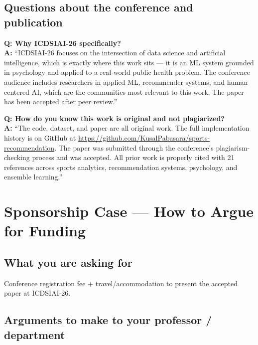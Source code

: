 \documentclass[12pt,a4paper]{article}
\begin{document}
\subsection{Questions about the conference and publication}

\begin{qabox}
\textbf{Q: Why ICDSIAI-26 specifically?}\\[4pt]
\textbf{A:} ``ICDSIAI-26 focuses on the intersection of data science and
artificial intelligence, which is exactly where this work sits --- it is an
ML system grounded in psychology and applied to a real-world public health
problem. The conference audience includes researchers in applied ML,
recommender systems, and human-centered AI, which are the communities most
relevant to this work. The paper has been accepted after peer review.''
\end{qabox}

\begin{qabox}
\begin{sloppypar}
\textbf{Q: How do you know this work is original and not plagiarized?}\\[4pt]
\textbf{A:} ``The code, dataset, and paper are all original work. The full
implementation history is on GitHub at
\url{https://github.com/KusalPabasara/sports-recommendation}.
The paper was submitted through the conference's plagiarism-checking process
and was accepted. All prior work is properly cited with 21 references across
sports analytics, recommendation systems, psychology, and ensemble learning.''
\end{sloppypar}
\end{qabox}

\section{Sponsorship Case --- How to Argue for Funding}

\subsection{What you are asking for}

Conference registration fee + travel/accommodation to present the accepted
paper at ICDSIAI-26.

\subsection{Arguments to make to your professor / department}
\end{document}
